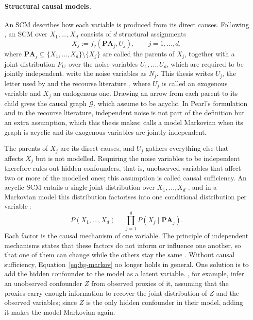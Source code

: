 \paragraph{Structural causal models.}
An SCM describes how each variable is produced from its direct causes. Following
\citet{peters2017elements}, an SCM over $X_1, \dots, X_d$ consists of $d$ structural
assignments
\begin{equation}
  X_j := f_j(\mathbf{PA}_j, U_j), \qquad j = 1, \dots, d,
  \label{eq:bg-scm}
\end{equation}
where $\mathbf{PA}_j \subseteq \{X_1, \dots, X_d\} \setminus \{X_j\}$ are called the parents of
$X_j$, together with a joint distribution $P_{\mathbf{U}}$ over the noise variables
$U_1, \dots, U_d$, which are required to be jointly independent. \citet{peters2017elements} write
the noise variables as $N_j$. This thesis writes $U_j$, the letter used by \citet{pearl2009overview}
and the recourse literature \cite{karimi2021algorithmic}, where $U_j$ is called an exogenous
variable and $X_j$ an endogenous one. Drawing an arrow from each parent to its child gives the
causal graph $\mathcal{G}$, which \citet{peters2017elements} assume to be acyclic. In Pearl's
formulation and in the recourse literature, independent noise is not part of the definition but
an extra assumption, which this thesis makes: \citet{pearl2009overview} calls a model Markovian
when its graph is acyclic and its exogenous variables are jointly independent.

The parents of $X_j$ are its direct causes, and $U_j$ gathers everything else that affects $X_j$
but is not modelled. Requiring the noise variables to be independent therefore rules out hidden
confounders, that is, unobserved variables that affect two or more of the modelled ones; this
assumption is called causal sufficiency. An acyclic SCM entails a single joint distribution over
$X_1, \dots, X_d$ \cite{peters2017elements}, and in a Markovian model this distribution
factorises into one conditional distribution per variable
\cite{pearl2009causality, pearl2009overview}:
\begin{equation}
  P(X_1, \dots, X_d) = \prod_{j=1}^{d} P(X_j \mid \mathbf{PA}_j).
  \label{eq:bg-markov}
\end{equation}
Each factor is the causal mechanism of one variable. The principle of independent
mechanisms states that these factors do not inform or influence one another, so that one of them
can change while the others stay the same \cite{peters2017elements}. Without causal sufficiency,
Equation~\ref{eq:bg-markov} no longer holds in general. One solution is to add the hidden
confounder to the model as a latent variable. \citet{louizos2017causal}, for example, infer an
unobserved confounder $Z$ from observed proxies of it, assuming that the proxies carry enough
information to recover the joint distribution of $Z$ and the observed variables; since $Z$ is
the only hidden confounder in their model, adding it makes the model Markovian again.


